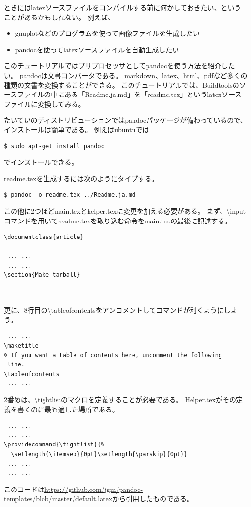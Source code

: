 ときにはlatexソースファイルをコンパイルする前に何かしておきたい、ということがあるかもしれない。
例えば、
\begin{itemize}
\item gnuplotなどのプログラムを使って画像ファイルを生成したい
\item pandocを使ってlatexソースファイルを自動生成したい
\end{itemize}

このチュートリアルではプリプロセッサとしてpandocを使う方法を紹介したい。
pandocは文書コンバータである。
markdown、latex、html、pdfなど多くの種類の文書を変換することができる。
このチュートリアルでは、Buildtoolsのソースファイルの中にある「Readme.ja.md」を「readme.tex」というlatexソースファイルに変換してみる。

たいていのディストリビューションではpandocパッケージが備わっているので、インストールは簡単である。
例えばubuntuでは
\begin{verbatim}
$ sudo apt-get install pandoc
\end{verbatim}
でインストールできる。

readme.texを生成するには次のようにタイプする。
\begin{verbatim}
$ pandoc -o readme.tex ../Readme.ja.md
\end{verbatim}

この他に2つほどmain.texとhelper.texに変更を加える必要がある。
まず、{\textbackslash}inputコマンドを用いてreadme.texを取り込む命令をmain.texの最後に記述する。
\begin{verbatim}
\documentclass{article}

 ... ...
 ... ...
\section{Make tarball}
  


\end{verbatim}
更に、8行目の{\textbackslash}tableofcontentsをアンコメントしてコマンドが利くようにしよう。
\begin{verbatim}
 ... ...
\maketitle
% If you want a table of contents here, uncomment the following
 line.
\tableofcontents
 ... ...
\end{verbatim}

2番めは、{\textbackslash}tightlistのマクロを定義することが必要である。
Helper.texがその定義を書くのに最も適した場所である。
\begin{verbatim}
 ... ...
 ... ...
\providecommand{\tightlist}{%
  \setlength{\itemsep}{0pt}\setlength{\parskip}{0pt}}
 ... ...
 ... ...
\end{verbatim}
このコードは\url{https://github.com/jgm/pandoc-templates/blob/master/default.latex}から引用したものである。

